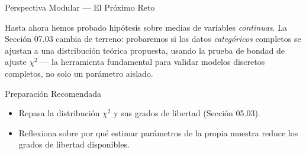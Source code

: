 \documentclass[10pt, aspectratio=169]{beamer}
\begin{document}
\begin{frame}{Perspectiva Modular --- El Próximo Reto}
  \scriptsize
  \begin{retoclase}
    Hasta ahora hemos probado hipótesis sobre medias de variables \emph{continuas}. La Sección 07.03 cambia de terreno: probaremos si los datos \emph{categóricos} completos se ajustan a una distribución teórica propuesta, usando la prueba de bondad de ajuste $\chi^2$ --- la herramienta fundamental para validar modelos discretos completos, no solo un parámetro aislado.
  \end{retoclase}

  \vspace{0.08cm}
  \pause
  \begin{alertblock}{Preparación Recomendada}
    \begin{itemize}\itemsep=0.06cm
      \item Repasa la distribución $\chi^2$ y sus grados de libertad (Sección 05.03).
      \item Reflexiona sobre por qué estimar parámetros de la propia muestra reduce los grados de libertad disponibles.
    \end{itemize}
  \end{alertblock}
\end{frame}
\end{document}
